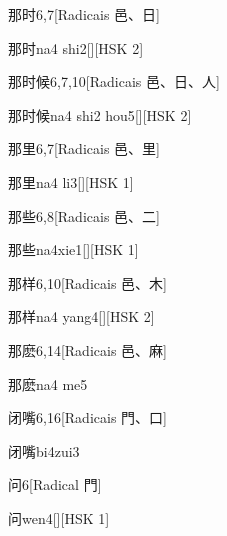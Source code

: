 \begin{entry}{那时}{6,7}[Radicais ⾢、⽇]
  \begin{phonetics}{那时}{na4 shi2}[][HSK 2]
  \end{phonetics}
\end{entry}

\begin{entry}{那时候}{6,7,10}[Radicais ⾢、⽇、⼈]
  \begin{phonetics}{那时候}{na4 shi2 hou5}[][HSK 2]
  \end{phonetics}
\end{entry}

\begin{entry}{那里}{6,7}[Radicais ⾢、⾥]
  \begin{phonetics}{那里}{na4 li3}[][HSK 1]
  \end{phonetics}
\end{entry}

\begin{entry}{那些}{6,8}[Radicais ⾢、⼆]
  \begin{phonetics}{那些}{na4xie1}[][HSK 1]
  \end{phonetics}
\end{entry}

\begin{entry}{那样}{6,10}[Radicais ⾢、⽊]
  \begin{phonetics}{那样}{na4 yang4}[][HSK 2]
  \end{phonetics}
\end{entry}

\begin{entry}{那麽}{6,14}[Radicais ⾢、⿇]
  \begin{phonetics}{那麽}{na4 me5}
  \end{phonetics}
\end{entry}

\begin{entry}{闭嘴}{6,16}[Radicais ⾨、⼝]
  \begin{phonetics}{闭嘴}{bi4zui3}
  \end{phonetics}
\end{entry}

\begin{entry}{问}{6}[Radical ⾨]
  \begin{phonetics}{问}{wen4}[][HSK 1]
  \end{phonetics}
\end{entry}

